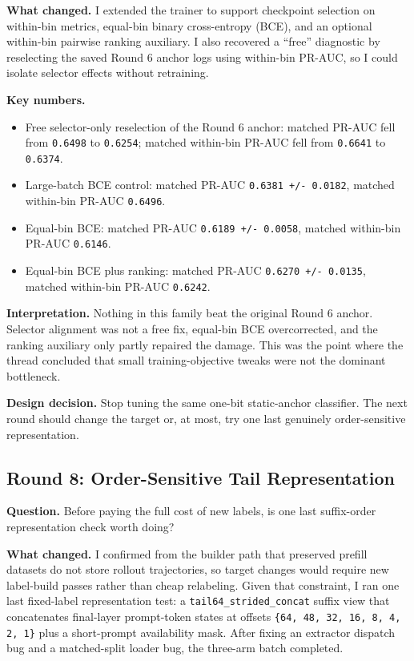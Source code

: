 \documentclass[11pt]{article}
\begin{document}
\textbf{What changed.} I extended the trainer to support checkpoint selection on within-bin metrics, equal-bin binary cross-entropy (BCE), and an optional within-bin pairwise ranking auxiliary. I also recovered a ``free'' diagnostic by reselecting the saved Round 6 anchor logs using within-bin PR-AUC, so I could isolate selector effects without retraining.

\textbf{Key numbers.}
\begin{itemize}
  \item Free selector-only reselection of the Round 6 anchor:
    matched PR-AUC fell from \texttt{0.6498} to \texttt{0.6254};
    matched within-bin PR-AUC fell from \texttt{0.6641} to \texttt{0.6374}.
  \item Large-batch BCE control:
    matched PR-AUC \texttt{0.6381 +/- 0.0182},
    matched within-bin PR-AUC \texttt{0.6496}.
  \item Equal-bin BCE:
    matched PR-AUC \texttt{0.6189 +/- 0.0058},
    matched within-bin PR-AUC \texttt{0.6146}.
  \item Equal-bin BCE plus ranking:
    matched PR-AUC \texttt{0.6270 +/- 0.0135},
    matched within-bin PR-AUC \texttt{0.6242}.
\end{itemize}

\textbf{Interpretation.} Nothing in this family beat the original Round 6 anchor. Selector alignment was not a free fix, equal-bin BCE overcorrected, and the ranking auxiliary only partly repaired the damage. This was the point where the thread concluded that small training-objective tweaks were not the dominant bottleneck.

\textbf{Design decision.} Stop tuning the same one-bit static-anchor classifier. The next round should change the target or, at most, try one last genuinely order-sensitive representation.

\subsection*{Round 8: Order-Sensitive Tail Representation}
\textbf{Question.} Before paying the full cost of new labels, is one last suffix-order representation check worth doing?

\textbf{What changed.} I confirmed from the builder path that preserved prefill datasets do not store rollout trajectories, so target changes would require new label-build passes rather than cheap relabeling. Given that constraint, I ran one last fixed-label representation test: a \texttt{tail64\_strided\_concat} suffix view that concatenates final-layer prompt-token states at offsets \texttt{\{64, 48, 32, 16, 8, 4, 2, 1\}} plus a short-prompt availability mask. After fixing an extractor dispatch bug and a matched-split loader bug, the three-arm batch completed.
\end{document}
